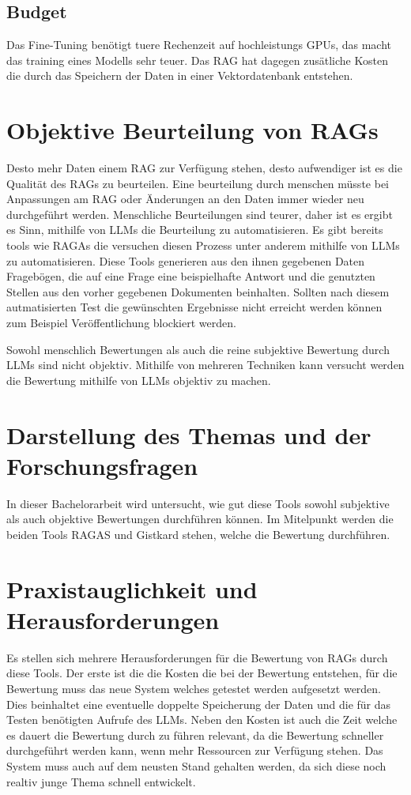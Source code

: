 \subsection{Budget}
Das Fine-Tuning benötigt tuere Rechenzeit auf hochleistungs GPUs, das macht das training eines Modells sehr teuer.
Das RAG hat dagegen zusätliche Kosten die durch das Speichern der Daten in einer Vektordatenbank entstehen.


\section{Objektive Beurteilung von RAGs}
Desto mehr Daten einem RAG zur Verfügung stehen, desto aufwendiger ist es die Qualität des RAGs zu beurteilen.
Eine beurteilung durch menschen müsste bei Anpassungen am RAG oder Änderungen an den Daten immer wieder neu durchgeführt werden.
Menschliche Beurteilungen sind teurer, daher ist es ergibt es Sinn, mithilfe von LLMs die Beurteilung zu automatisieren.
Es gibt bereits tools wie RAGAs die versuchen diesen Prozess unter anderem mithilfe von LLMs zu automatisieren.
Diese Tools generieren aus den ihnen gegebenen Daten Fragebögen, die auf eine Frage eine beispielhafte Antwort und die genutzten Stellen aus den vorher gegebenen Dokumenten beinhalten.
Sollten nach diesem autmatisierten Test die gewünschten Ergebnisse nicht erreicht werden können zum Beispiel Veröffentlichung blockiert werden.

Sowohl menschlich Bewertungen als auch die reine subjektive Bewertung durch LLMs sind nicht objektiv.
Mithilfe von mehreren Techniken kann versucht werden die Bewertung mithilfe von LLMs objektiv zu machen.

\section{Darstellung des Themas und der Forschungsfragen}
In dieser Bachelorarbeit wird untersucht, wie gut diese Tools sowohl subjektive als auch objektive Bewertungen durchführen können.
Im Mitelpunkt werden die beiden Tools RAGAS und Gistkard stehen, welche die Bewertung durchführen.




\section{Praxistauglichkeit und Herausforderungen}
Es stellen sich mehrere Herausforderungen für die Bewertung von RAGs durch diese Tools.
Der erste ist die die Kosten die bei der Bewertung entstehen, für die Bewertung muss das neue System welches getestet werden aufgesetzt werden.
Dies beinhaltet eine eventuelle doppelte Speicherung der Daten und die für das Testen benötigten Aufrufe des LLMs.
Neben den Kosten ist auch die Zeit welche es dauert die Bewertung durch zu führen relevant, da die Bewertung schneller durchgeführt werden kann, wenn mehr Ressourcen zur Verfügung stehen.
Das System muss auch auf dem neusten Stand gehalten werden, da sich diese noch realtiv junge Thema schnell entwickelt.

